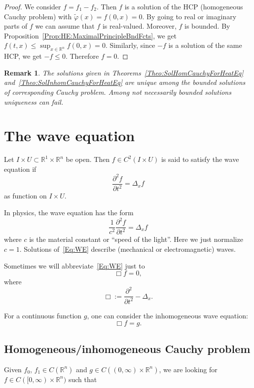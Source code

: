 \documentclass[12pt, oneside, a4paper]{article}
\theoremstyle{dfn}
\newtheorem{rem}[thm]{Remark}
\def\Rbb{\ensuremath{\mathbb{R}}}
\begin{document}
\begin{proof}
We consider $f = f_1 - f_2$. Then $f$ is a solution of the HCP (homogeneous Cauchy problem) with $\widetilde{\varphi}(x) = f(0,x) = 0$. By going to real or imaginary parts of $f$ we can assume that $f$ is real-valued. Moreover, $f$ is bounded. By Proposition~\ref{Prop:HE:MaximalPrincipleBndFcts}, we get $f(t,x) \leqslant \sup_{x \in \Rbb^n} f(0,x) = 0$. Similarly, since $-f$ is a solution of the same HCP, we get $-f \leqslant 0$. Therefore $f = 0$.
\end{proof}

\begin{rem}
The solutions given in Theorems~\ref{Theo:SolHomCauchyForHeatEq} and~\ref{Theo:SolInhomCauchyForHeatEq} are unique among the bounded solutions of corresponding Cauchy problem. Among not necessarily bounded solutions uniqueness can fail.
\end{rem}

\section{The wave equation}

Let $I \times U \subset \Rbb^1 \times \Rbb^n$ be open. Then $f \in C^2(I \times U)$ is said to satisfy the wave equation if
\begin{equation}\label{Eq:WE}
\frac{\partial^2 f}{\partial t^2} = \Delta_x f
\tag{W}
\end{equation}
as function on $I \times U$.

In physics, the wave equation has the form
\[
\frac{1}{c^2} \frac{\partial^2 f}{\partial t^2} = \Delta_x f
\]
where $c$ is the material constant or ``speed of the light''. Here we just normalize $c = 1$. Solutions of~\eqref{Eq:WE} describe (mechanical or electromagnetic) waves.

Sometimes we will abbreviate~\eqref{Eq:WE} just to
\[
\Box f = 0,
\]
where
\[
\Box := \frac{\partial^2}{\partial t^2} - \Delta_x.
\]

For a continuous function $g$, one can consider the inhomogeneous wave equation:
\[
\Box f = g.
\]

\subsection{Homogeneous/inhomogeneous Cauchy problem}

Given $f_0$, $f_1 \in C(\Rbb^n)$ and $g \in C((0,\infty)\times \Rbb^n)$, we are looking for $f \in C([0,\infty) \times \Rbb^n)$ such that
\end{document}
